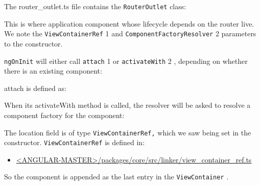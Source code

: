 The router\_outlet.ts file contains the
\texttt{RouterOutlet}
class:



This is where application component whose lifecycle depends on the router live. We
note the
\texttt{ViewContainerRef}
1
and
\texttt{ComponentFactoryResolver}
2
parameters to the
constructor.

\texttt{ngOnInit}
will either call
\texttt{attach}
1
or
\texttt{activateWith}
2
, depending on whether there is
an existing component:



attach is defined as:



When its activateWith method is called, the resolver will be asked to resolve a
component factory for the component:



The location field is of type
\texttt{ViewContainerRef,}
which we saw being set in the
constructor.
\texttt{ViewContainerRef}
is defined in:

\begin{itemize}
  \item \href{https://github.com/angular/angular/blob/master/packages/core/src/linker/view_container_ref.ts}
        {<ANGULAR-MASTER>/packages/core/src/linker/view\_container\_ref.ts}
\end{itemize}



So the component is appended as the last entry in the
\texttt{ViewContainer}
.
